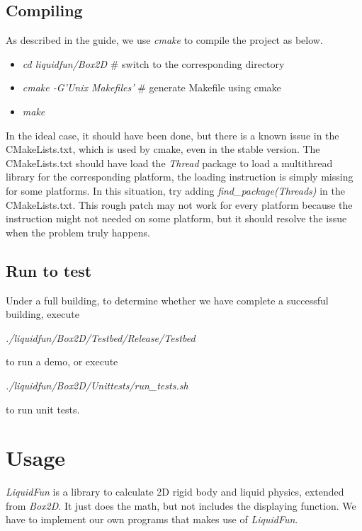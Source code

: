 \documentclass[UTF8]{ctexart}
\begin{document}
        \subsection{Compiling}

            As described in the guide, we use \textit{cmake} to compile the project as below.

            \begin{itemize}
                \item \textit{cd liquidfun/Box2D} \# switch to the corresponding directory
                \item \textit{cmake -G'Unix Makefiles'} \# generate Makefile using cmake
                \item \textit{make}
            \end{itemize}

            In the ideal case, it should have been done, but there is a known issue in the CMakeLists.txt, which is used by cmake, even in the stable version. The CMakeLists.txt should have load the \textit{Thread} package to load a multithread library for the corresponding platform, the loading instruction is simply missing for some platforms. In this situation, try adding \textit{find\_package(Threads)} in the CMakeLists.txt. This rough patch may not work for every platform because the instruction might not needed on some platform, but it should resolve the issue when the problem truly happens.

        \subsection{Run to test}

            Under a full building, to determine whether we have complete a successful building, execute
            
            \textit{./liquidfun/Box2D/Testbed/Release/Testbed}
            
            to run a demo, or execute
            
            \textit{./liquidfun/Box2D/Unittests/run\_tests.sh}
            
            to run unit tests.

    \section{Usage}

        \textit{LiquidFun} is a library to calculate 2D rigid body and liquid physics, extended from \textit{Box2D}. It just does the math, but not includes the displaying function. We have to implement our own programs that makes use of \textit{LiquidFun}.
        
\end{document}
